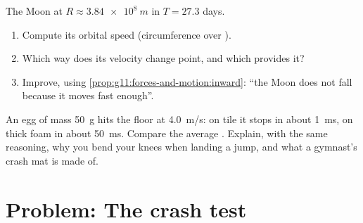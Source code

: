 \begin{exercise}[$\star\star\star$]\label{exo:g11:forces-and-motion:14}
The Moon  at $R \approx \qty{3.84e8}{m}$ in $T = \num{27.3}$ days.
\begin{enumerate}
  \item Compute its orbital speed (circumference over ).
  \item Which way does its velocity change point, and which 
        provides it?
  \item Improve, using \cref{prop:g11:forces-and-motion:inward}: ``the
        Moon does not fall because it moves fast enough''.
\end{enumerate}
\end{exercise}

\begin{exercise}[$\star\star\star$]\label{exo:g11:forces-and-motion:15}
An egg of mass \qty{50}{g} hits the floor at \qty{4.0}{m/s}: on tile it
stops in about \qty{1}{ms}, on thick foam in about \qty{50}{ms}. Compare
the average . Explain, with the same reasoning, why you bend your
knees when landing a jump, and what a gymnast's crash mat is made of.
\end{exercise}

\section{Problem: The crash test}

